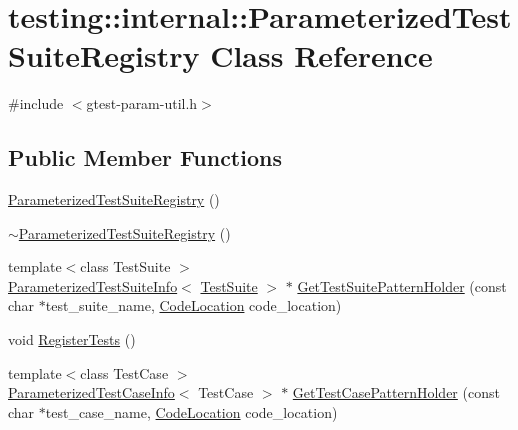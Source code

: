 \hypertarget{classtesting_1_1internal_1_1ParameterizedTestSuiteRegistry}{}\section{testing\+:\+:internal\+:\+:Parameterized\+Test\+Suite\+Registry Class Reference}
\label{classtesting_1_1internal_1_1ParameterizedTestSuiteRegistry}


{\ttfamily \#include $<$gtest-\/param-\/util.\+h$>$}

\subsection*{Public Member Functions}
\begin{DoxyCompactItemize}
\item 
\hyperlink{classtesting_1_1internal_1_1ParameterizedTestSuiteRegistry_ae3827c085ed16faaa9197486513292c0}{Parameterized\+Test\+Suite\+Registry} ()
\item 
\hyperlink{classtesting_1_1internal_1_1ParameterizedTestSuiteRegistry_ab29f7a321883945d7f86f3292c100eb5}{$\sim$\+Parameterized\+Test\+Suite\+Registry} ()
\item 
{\footnotesize template$<$class Test\+Suite $>$ }\\\hyperlink{classtesting_1_1internal_1_1ParameterizedTestSuiteInfo}{Parameterized\+Test\+Suite\+Info}$<$ \hyperlink{classtesting_1_1TestSuite}{Test\+Suite} $>$ $\ast$ \hyperlink{classtesting_1_1internal_1_1ParameterizedTestSuiteRegistry_a89ef6dd228f4188e1928513e860580d0}{Get\+Test\+Suite\+Pattern\+Holder} (const char $\ast$test\+\_\+suite\+\_\+name, \hyperlink{structtesting_1_1internal_1_1CodeLocation}{Code\+Location} code\+\_\+location)
\item 
void \hyperlink{classtesting_1_1internal_1_1ParameterizedTestSuiteRegistry_a44c2ee0296de42dc6ca7abbf48d00495}{Register\+Tests} ()
\item 
{\footnotesize template$<$class Test\+Case $>$ }\\\hyperlink{namespacetesting_1_1internal_aac31682b6b41997d6cc610a5787dc8bc}{Parameterized\+Test\+Case\+Info}$<$ Test\+Case $>$ $\ast$ \hyperlink{classtesting_1_1internal_1_1ParameterizedTestSuiteRegistry_a3fe06fb4e1b4194dae1fbcdf3560fbd3}{Get\+Test\+Case\+Pattern\+Holder} (const char $\ast$test\+\_\+case\+\_\+name, \hyperlink{structtesting_1_1internal_1_1CodeLocation}{Code\+Location} code\+\_\+location)
\end{DoxyCompactItemize}
